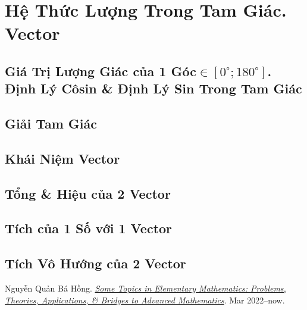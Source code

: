 \documentclass[oneside]{book}
\numberwithin{equation}{section}
\begin{document}
\chapter{Hệ Thức Lượng Trong Tam Giác. Vector}

\section{Giá Trị Lượng Giác của 1 Góc$\in[0^\circ;180^\circ]$. Định Lý Côsin \& Định Lý Sin Trong Tam Giác}

\section{Giải Tam Giác}

\section{Khái Niệm Vector}

\section{Tổng \& Hiệu của 2 Vector}

\section{Tích của 1 Số với 1 Vector}

\section{Tích Vô Hướng của 2 Vector}


\begin{thebibliography}{99}
	 Nguyễn Quản Bá Hồng. \href{https://github.com/NQBH/hobby/blob/master/elementary_mathematics/some_topics_in_elementary_mathematics_problems_theories_applications_bridges_to_advanced_mathematics/NQBH_some_topics_in_elementary_mathematics_problems_theories_applications_bridges_to_advanced_mathematics.pdf}{\textit{Some Topics in Elementary Mathematics: Problems, Theories, Applications, \& Bridges to Advanced Mathematics}}. Mar 2022--now.
\end{thebibliography}


\printbibliography[heading=bibintoc]
\end{document}
